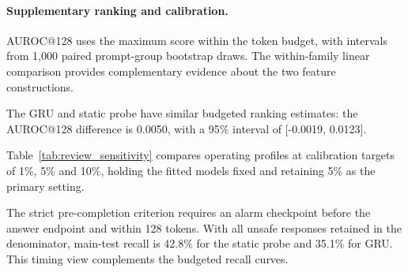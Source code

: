 \paragraph{Supplementary ranking and calibration.}

\ReviewRankingEN{} AUROC@128 uses the maximum score within the token budget, with intervals from 1,000 paired prompt-group bootstrap draws. The within-family linear comparison provides complementary evidence about the two feature constructions.

The GRU and static probe have similar budgeted ranking estimates: the AUROC@128 difference is 0.0050, with a 95\% interval of [-0.0019, 0.0123].

Table~\ref{tab:review_sensitivity} compares operating profiles at calibration targets of 1\%, 5\% and 10\%, holding the fitted models fixed and retaining 5\% as the primary setting.

The strict pre-completion criterion requires an alarm checkpoint before the answer endpoint and within 128 tokens. With all unsafe responses retained in the denominator, main-test recall is 42.8\% for the static probe and 35.1\% for GRU. This timing view complements the budgeted recall curves.
